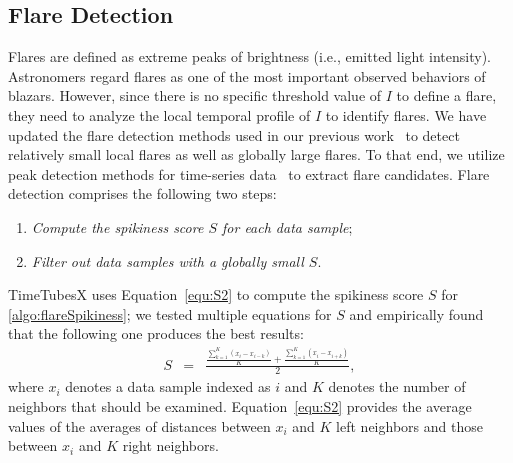 \subsection{Flare Detection}\label{sec:flareDetection}
Flares are defined as extreme peaks of brightness (i.e., emitted light intensity). 
Astronomers regard flares as one of the most important observed behaviors of blazars.
However, since there is no specific threshold value of $I$ to define a flare, 
they need to analyze the local temporal profile of $I$ to identify flares.
We have updated the flare detection methods used in our previous work~\cite{Sawada2018}
to detect relatively small local flares as well as globally large flares.
To that end, we utilize peak detection methods for time-series data~\cite{Palshikar2009} to extract flare candidates. 
Flare detection comprises the following two steps:
\begin{enumerate}[nosep, label=\textsl{Step \arabic*}:, ref=\textsl{Step \arabic*}, align=parleft, leftmargin=*]
    \item \textsl{Compute the spikiness score $S$ for each data sample}; \label{algo:flareSpikiness}
    \item \textsl{Filter out data samples with a globally small $S$}. \label{algo:flareFilter}
\end{enumerate}
TimeTubesX uses Equation~\ref{equ:S2} to compute the spikiness score $S$ for \ref{algo:flareSpikiness};
we tested multiple equations for $S$ and empirically found that the following one produces the best results:
\begin{eqnarray}
    S &=& \frac{\frac{\sum_{k=1}^{K}(x_i - x_{i - k})}{K} + \frac{\sum_{k=1}^{K}(x_i - x_{i + k})}{K}}{2}\label{equ:S2},
\end{eqnarray}
where $x_i$ denotes a data sample indexed as $i$ and $K$ denotes the number of neighbors that should be examined.
Equation~\ref{equ:S2} provides the average values of the averages of distances between $x_i$ and $K$ left neighbors and those between $x_i$ and $K$ right neighbors.
